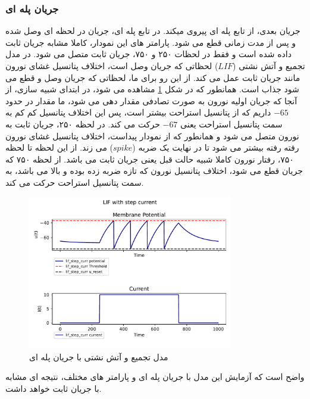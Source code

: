 \documentclass{article}
\begin{document}
            \subsubsection{جریان پله ای}
                جریان بعدی، از تابع پله ای پیروی میکند. در تابع پله ای، جریان در لحظه ای وصل شده و پس از مدت زمانی قطع می شود. پارامتر های این نمودار، کاملا مشابه جریان ثابت داده شده است و فقط در لحظات ۲۵۰ و ۷۵۰، جریان ثابت متصل می شود. در مدل تجمیع و آتش نشتی
                ($LIF$)
                لحظاتی که جریان وصل است، اختلاف پتانسیل غشای نورون مانند جریان ثابت عمل می کند. از این رو برای ما، لحظاتی که جریان وصل و قطع می شود جذاب است. همانطور که در شکل 
                \ref{fig:lif-step-curr} 
                مشاهده می شود، در ابتدای شبیه سازی، از آنجا که جریان اولیه نورون به صورت تصادفی مقدار دهی می شود، ما مقدار در حدود 
                $-65$ 
                داریم که از پتانسیل استراحت بیشتر است، پس این اختلاف پتانسیل کم کم به سمت پتانسیل استراحت یعنی 
                $-67$ 
                حرکت می کند. در لحظه ۲۵۰، جریان ثابت به نورون متصل می شود و همانطور که از نمودار پیداست، اختلاف پتانسیل غشای نورون رفته رفته بیشتر می شود تا در نهایت یک ضربه
                ($spike$)
                می زند. از این لحظه تا لحظه  ۷۵۰، رفتار نورون کاملا شبیه حالت قبل یعنی جریان ثابت می باشد. از لحظه ۷۵۰ که جریان قطع می شود، اختلاف پتانسیل نورون که تازه ضربه زده بوده و بالا می باشد، به سمت پتانسیل استراحت حرکت می کند.
                \begin{figure}[H]
                    \centering
                    \includegraphics[width=0.8\textwidth]{plots/LIF with step current.pdf} 
                    \caption{مدل تجمیع و آتش نشتی با جریان پله ای}
                    \label{fig:lif-step-curr}
                \end{figure}
                واضح است که آزمایش این مدل با جریان پله ای و پارامتر های مختلف، نتیجه ای مشابه با جریان ثابت خواهد داشت.
\end{document}
